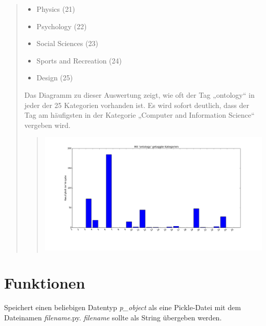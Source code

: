 \documentclass[letterpaper,10pt,english]{sphinxmanual}
\begin{document}
\begin{quote}
\begin{itemize}
\item {} 
Physics (21)

\item {} 
Psychology (22)

\item {} 
Social Sciences (23)

\item {} 
Sports and Recreation (24)

\item {} 
Design (25)

\end{itemize}

Das Diagramm zu dieser Auswertung zeigt, wie oft der Tag „ontology“ in jeder der 25 Kategorien vorhanden ist. Es wird sofort deutlich, dass der Tag am häufigsten in der Kategorie „Computer and Information Science“ vergeben wird.
\begin{quote}

\includegraphics{ontology.png}
\end{quote}
\end{quote}


\section{Funktionen}
\label{project_3:funktionen}

\begin{fulllineitems}
\label{project_3:project_3.save_as_pickle}
Speichert einen beliebigen Datentyp \emph{p\_object} als eine Pickle-Datei mit dem Dateinamen \emph{filename}.py. \emph{filename} sollte als String übergeben werden.

\end{fulllineitems}
\end{document}
